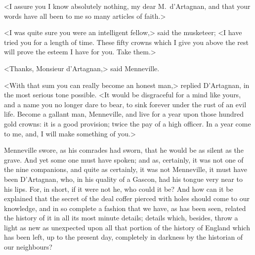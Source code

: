 <I assure you I know absolutely nothing, my dear M.~d'Artagnan, and that your words have all been to me so many articles of faith.>

<I was quite sure you were an intelligent fellow,> said the musketeer; <I have tried you for a length of time. These fifty crowns which I give you above the rest will prove the esteem I have for you. Take them.>

<Thanks, Monsieur d'Artagnan,> said Menneville.

<With that sum you can really become an honest man,> replied D'Artagnan, in the most serious tone possible. <It would be disgraceful for a mind like yours, and a name you no longer dare to bear, to sink forever under the rust of an evil life. Become a gallant man, Menneville, and live for a year upon those hundred gold crowns: it is a good provision; twice the pay of a high officer. In a year come to me, and,  I will make something of you.>

Menneville swore, as his comrades had sworn, that he would be as silent as the grave. And yet some one must have spoken; and as, certainly, it was not one of the nine companions, and quite as certainly, it was not Menneville, it must have been D'Artagnan, who, in his quality of a Gascon, had his tongue very near to his lips. For, in short, if it were not he, who could it be? And how can it be explained that the secret of the deal coffer pierced with holes should come to our knowledge, and in so complete a fashion that we have, as has been seen, related the history of it in all its most minute details; details which, besides, throw a light as new as unexpected upon all that portion of the history of England which has been left, up to the present day, completely in darkness by the historian of our neighbours? 